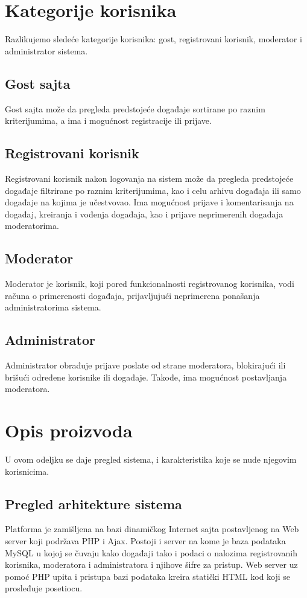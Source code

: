 \documentclass[11pt,a4paper]{article}
\begin{document}
\newpage

\section{Kategorije korisnika}
Razlikujemo sledeće kategorije korisnika: gost, registrovani korisnik, moderator i administrator sistema.
\subsection{Gost sajta}
Gost sajta može da pregleda predstojeće događaje sortirane po raznim kriterijumima, a ima i mogućnost registracije ili prijave.
\subsection{Registrovani korisnik}
Registrovani korisnik nakon logovanja na sistem može da pregleda predstojeće događaje filtrirane po raznim kriterijumima, kao i celu arhivu događaja ili samo događaje na kojima je učestvovao. Ima mogućnost prijave i komentarisanja na događaj, kreiranja i vođenja događaja, kao i prijave neprimerenih događaja moderatorima.
\subsection{Moderator}
Moderator je korisnik, koji pored funkcionalnosti registrovanog korisnika, vodi računa o primerenosti događaja, prijavljujući neprimerena ponašanja administratorima sistema.
\subsection{Administrator}
Administrator obrađuje prijave poslate od strane moderatora, blokirajući ili brišući određene korisnike ili događaje. Takođe, ima mogućnost postavljanja moderatora.

\section{Opis proizvoda}
U ovom odeljku se daje pregled sistema, i karakteristika koje se nude njegovim korisnicima.
\subsection{Pregled arhitekture sistema}
Platforma je zamišljena na bazi dinamičkog Internet sajta postavljenog na Web server koji podržava PHP i Ajax. Postoji i server na kome je baza podataka MySQL u kojoj se čuvaju kako događaji tako i podaci o nalozima registrovanih korisnika, moderatora i administratora i njihove šifre za pristup. Web server uz pomoć PHP upita i pristupa bazi podataka kreira statički HTML kod koji se prosleđuje posetiocu.
\end{document}
